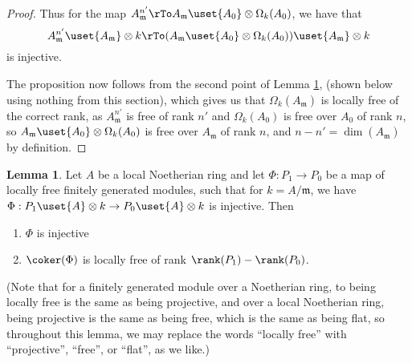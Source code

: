 \documentclass[12 pt]{article}
\theoremstyle{definition}
\newtheorem{lemma}[thm]{Lemma}
\renewcommand{\(}{\left(}
\renewcommand{\)}{\right)}
\newcommand\fm{{\mathfrak m}}
\begin{document}
\begin{proof}
Thus for the map $A_{\fm}^{n'} \rTo A_\fm \uset{A_0}\otimes \Omega_k(A_0)$, we have that
\[A_{\fm}^{n'} \uset{A_{\fm}}\otimes k \rTo (A_\fm \uset{A_0}\otimes \Omega_k(A_0)) \uset{A_{\fm}}\otimes k\]
is injective.

The proposition now follows from the second point of Lemma \ref{phi inj mod m means phi inj}, (shown below using nothing from this section), which gives us that $\Omega_k(A_\fm)$ is locally free of the correct rank, as $A_\fm^{n'}$ is free of rank $n'$ and $\Omega_k(A_0)$ is free over $A_0$ of rank $n$, so $A_\fm \uset{A_0}\otimes \Omega_k(A_0)$ is free over $A_\fm$ of rank $n$, and $n-n'=\dim(A_\fm)$ by definition.
\end{proof}

\begin{lemma} Let $A$ be a local Noetherian ring and let $\Phi:P_1 \to P_0$ be a map of locally free finitely generated modules, such that for $k=A/\fm$, we have $\Phi: P_1 \uset{A}\otimes k \to P_0 \uset{A}\otimes k$ is injective. Then
\begin{enumerate}
\item $\Phi$ is injective
\item $\coker(\Phi)$ is locally free of rank $\rank(P_1)-\rank(P_0)$.
\end{enumerate}

(Note that for a finitely generated module over a Noetherian ring, to being locally free is the same as being projective, and over a local Noetherian ring, being projective is the same as being free, which is the same as being flat, so throughout this lemma, we may replace the words ``locally free'' with ``projective'', ``free'', or ``flat'', as we like.)
\label{phi inj mod m means phi inj}
\end{lemma}
\end{document}
